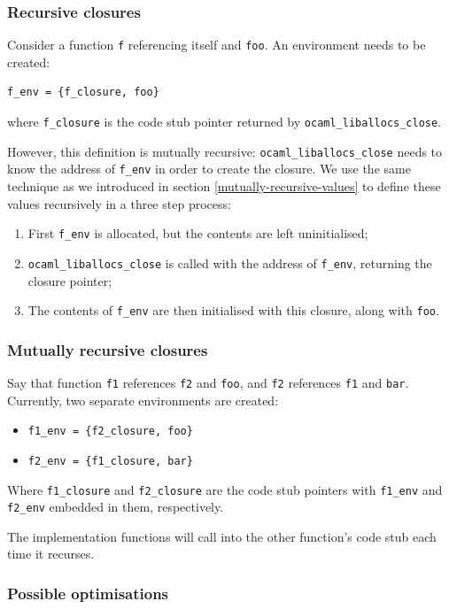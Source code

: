 \documentclass[12pt,a4paper,twoside,openright]{report}
\begin{document}
\subsubsection{Recursive closures}

Consider a function \lstinline!f! referencing itself and \lstinline!foo!. An
environment needs to be created:
\begin{lstlisting}
f_env = {f_closure, foo}\end{lstlisting}
where \lstinline!f_closure! is the code stub pointer returned by \lstinline!ocaml_liballocs_close!.

However, this definition is mutually recursive:
\lstinline!ocaml_liballocs_close! needs to know the address of
\lstinline!f_env! in order to create the closure.
We use the same technique as
we introduced in section \ref{mutually-recursive-values} to define these values recursively in a three step process:
\begin{enumerate}
  \item First \lstinline!f_env! is allocated, but the contents are left uninitialised;
  \item \lstinline!ocaml_liballocs_close! is called with the address of \lstinline!f_env!, returning the closure pointer;
  \item The contents of \lstinline!f_env! are then initialised with this closure, along with \lstinline!foo!.
\end{enumerate}

\subsubsection{Mutually recursive closures}

Say that function \lstinline!f1! references \lstinline!f2! and
\lstinline!foo!, and \lstinline!f2! references \lstinline!f1! and
\lstinline!bar!. Currently, two separate environments are created:
\begin{itemize}
  \item \lstinline!f1_env = {f2_closure, foo}!
  \item \lstinline!f2_env = {f1_closure, bar}!
\end{itemize}
Where \lstinline!f1_closure! and \lstinline!f2_closure! are the code stub pointers
with \lstinline!f1_env! and \lstinline!f2_env! embedded in them, respectively.

The implementation functions will call into the other function's code stub
each time it recurses.

\subsubsection{Possible optimisations}
\end{document}
